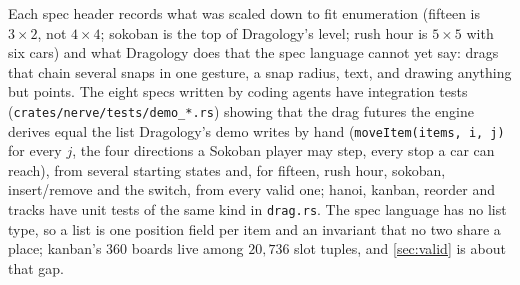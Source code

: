 Each spec header records what was scaled down to fit enumeration (fifteen is $3\times2$, not $4\times4$;
sokoban is the top of Dragology's level; rush hour is $5\times5$ with six cars) and what Dragology does that
the spec language cannot yet say: drags that chain several snaps in one gesture, a snap radius, text, and
drawing anything but points. The eight specs written by coding agents have integration tests
(\texttt{crates/nerve/tests/demo\_*.rs}) showing that the drag futures the engine derives equal the list
Dragology's demo writes by hand (\texttt{moveItem(items, i, j)} for every $j$, the four directions a Sokoban
player may step, every stop a car can reach), from several starting states and, for fifteen, rush hour,
sokoban, insert/remove and the switch, from every valid one; hanoi, kanban, reorder and tracks have unit tests
of the same kind in \texttt{drag.rs}. The spec language has no list type, so a list is one position field per
item and an invariant that no two share a place; kanban's 360 boards live among $20{,}736$ slot tuples, and
\cref{sec:valid} is about that gap.

\begin{table}[t]
\centering
\caption{\textbf{Trained on its whole spec, one network per interface is exact.} Each row is one interface and
its own network, trained on every (state, action) cell with the configuration of Part I (300 epochs, AdamW,
weight decay $0.05$, factored head on) on a local RTX A4500; continuous specs train on $8{,}000$ sampled pairs
for $1{,}000$ epochs and are scored on $1{,}000$ fresh ones. \emph{States} counts states the invariants allow;
\emph{cells} counts legal (state, action) pairs; \emph{wall s} is wall-clock training time with several runs
sharing the GPU (\texttt{docs/paper2/timings.md}); \emph{exact} is the worst seed and \emph{violations} the
worst seed's rate of answers that break a rule. Rows are generated from \texttt{experiments/round2/results.jsonl}
and fill in as the sweep completes.}
\label{tab:round2}
\small
\setlength{\tabcolsep}{4pt}
\end{table}

